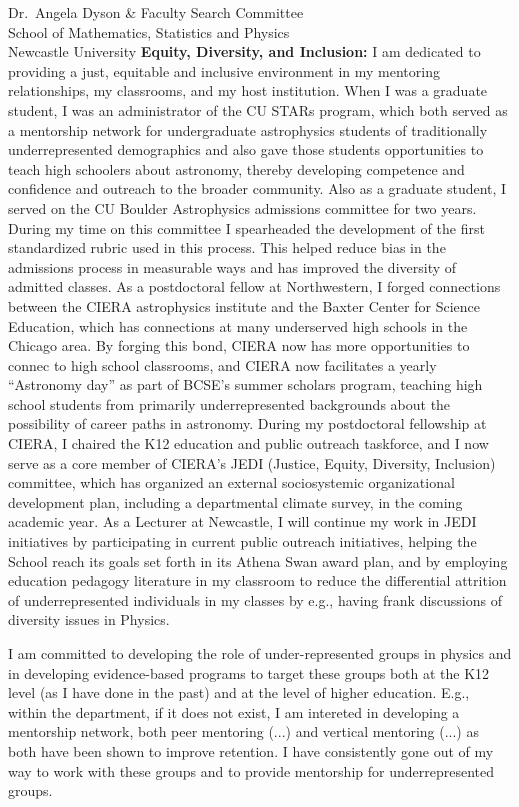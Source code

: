 \documentclass[12pt]{letter}
\begin{document}
\begin{letter}{
        Dr.~Angela Dyson \& Faculty Search Committee \\
        School of Mathematics, Statistics and Physics \\
        Newcastle University}
    \textbf{Equity, Diversity, and Inclusion:} I am dedicated to providing a just, equitable and inclusive environment in my mentoring relationships, my classrooms, and my host institution.
    When I was a graduate student, I was an administrator of the CU STARs program, which both served as a mentorship network for undergraduate astrophysics students of traditionally underrepresented demographics and also gave those students opportunities to teach high schoolers about astronomy, thereby developing competence and confidence and outreach to the broader community.
    Also as a graduate student, I served on the CU Boulder Astrophysics admissions committee for two years.
    During my time on this committee I spearheaded the development of the first standardized rubric used in this process.
    This helped reduce bias in the admissions process in measurable ways and has improved the diversity of admitted classes.
    As a postdoctoral fellow at Northwestern, I forged connections between the CIERA astrophysics institute and the Baxter Center for Science Education, which has connections at many underserved high schools in the Chicago area.
    By forging this bond, CIERA  now has more opportunities to connec to high school classrooms, and CIERA now facilitates a yearly ``Astronomy day'' as part of BCSE's summer scholars program, teaching high school students from primarily underrepresented backgrounds about the possibility of career paths in astronomy.
    During my postdoctoral fellowship at CIERA, I chaired the K12 education and public outreach taskforce, and I now serve as a core member of CIERA's JEDI (Justice, Equity, Diversity, Inclusion) committee, which has organized an external sociosystemic organizational development plan, including a departmental climate survey, in the coming academic year.
    As a Lecturer at Newcastle, I will continue my work in JEDI initiatives by participating in current public outreach initiatives, helping the School reach its goals set forth in its Athena Swan award plan, and by employing education pedagogy literature in my classroom to reduce the differential attrition of underrepresented individuals in my classes by e.g., having frank discussions of diversity issues in Physics. 


    I am committed to developing the role of under-represented groups in physics and in developing evidence-based programs to target these groups both at the K12 level (as I have done in the past) and at the level of higher education.
    E.g., within the department, if it does not exist, I am intereted in developing a mentorship network, both peer mentoring (...) and vertical mentoring (...) as both have been shown to improve retention.
    I have consistently gone out of my way to work with these groups and to provide mentorship for underrepresented groups.


\end{letter}
\end{document}
